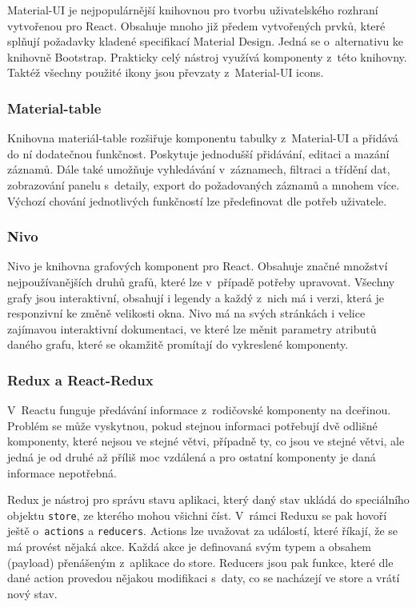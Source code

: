 Material-UI je nejpopulárnější knihovnou pro tvorbu uživatelského rozhraní vytvořenou pro React. Obsahuje mnoho již předem vytvořených prvků, které splňují požadavky kladené specifikací Material Design. Jedná se o~alternativu ke knihovně Bootstrap. Prakticky celý nástroj využívá komponenty z~této knihovny. Taktéž všechny použité ikony jsou převzaty z~Material-UI icons.

\subsubsection *{Material-table}

Knihovna materiál-table rozšiřuje komponentu tabulky z~Material-UI a přidává do ní dodatečnou funkčnost. Poskytuje jednodušší přidávání, editaci a mazání záznamů. Dále také umožňuje vyhledávání v~záznamech, filtraci a třídění dat, zobrazování panelu s~detaily, export do požadovaných záznamů a mnohem více. Výchozí chování jednotlivých funkčností lze předefinovat dle potřeb uživatele.

\subsubsection *{Nivo}

Nivo je knihovna grafových komponent pro React. Obsahuje značné množství nejpoužívanějších druhů grafů, které lze v~případě potřeby upravovat. Všechny grafy jsou interaktivní, obsahují i legendy a každý z~nich má i verzi, která je responzivní ke změně velikosti okna. Nivo má na svých stránkách i velice zajímavou interaktivní dokumentaci, ve které lze měnit parametry atributů daného grafu, které se okamžitě promítají do vykreslené komponenty. 

\subsubsection *{Redux a React-Redux}

V~Reactu funguje předávání informace z~rodičovské komponenty na dceřinou. Problém se může vyskytnou, pokud stejnou informaci potřebují dvě odlišné komponenty, které nejsou ve stejné větvi, případně ty, co jsou ve stejné větvi, ale jedná je od druhé až příliš moc vzdálená a pro ostatní komponenty je daná informace nepotřebná. 

Redux je nástroj pro správu stavu aplikaci, který daný stav ukládá do speciálního objektu \texttt{store}, ze kterého mohou všichni číst. V~rámci Reduxu se pak hovoří ještě o~\texttt{actions} a \texttt{reducers}. Actions lze uvažovat za událostí, které říkají, že se má provést nějaká akce. Každá akce je definovaná svým typem a obsahem (payload) přenášeným z~aplikace do store. Reducers jsou pak funkce, které dle dané action provedou nějakou modifikaci s~daty, co se nacházejí ve store a vrátí nový stav.

